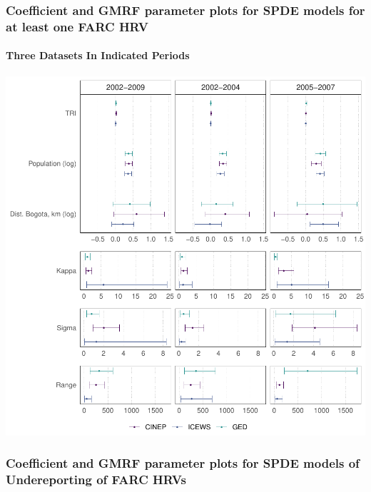 \documentclass[
]{article}
\begin{document}
\hypertarget{coefficient-and-gmrf-parameter-plots-for-spde-models-for-at-least-one-farc-hrv}{%
\subsubsection{Coefficient and GMRF parameter plots for SPDE models for at least one FARC HRV}\label{coefficient-and-gmrf-parameter-plots-for-spde-models-for-at-least-one-farc-hrv}}

\hypertarget{three-datasets-in-indicated-periods}{%
\paragraph{Three Datasets In Indicated Periods}\label{three-datasets-in-indicated-periods}}

\begin{center}\includegraphics[width=1\linewidth]{INLA_Model_Tables_files/figure-latex/unnamed-chunk-8-1} \end{center}

\pagebreak

\hypertarget{coefficient-and-gmrf-parameter-plots-for-spde-models-of-undereporting-of-farc-hrvs}{%
\subsubsection{Coefficient and GMRF parameter plots for SPDE models of Undereporting of FARC HRVs}\label{coefficient-and-gmrf-parameter-plots-for-spde-models-of-undereporting-of-farc-hrvs}}
\end{document}
